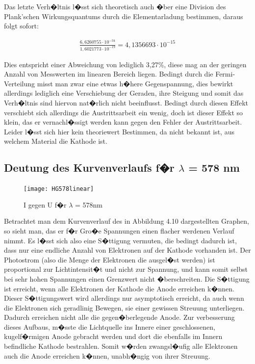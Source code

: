 \documentclass[a4paper, 10pt]{report}%
\begin{document}
Das letzte Verh�ltnis l�sst sich theoretisch auch �ber eine Division des Plank'schen Wirkungsquantums durch die Elementarladung bestimmen, daraus folgt sofort:

\begin{eqnarray}
\nonumber
\frac{6,6260755 \cdot 10^{-34}}{1,6021773 \cdot 10^{-19}} = 4,1356693 \cdot 10^{-15}
\end{eqnarray}

Dies entspricht einer Abweichung von lediglich 3,27\%, diese mag an der geringen Anzahl von Messwerten im linearen Bereich liegen. Bedingt durch die Fermi-Verteilung misst man zwar eine etwas h�here Gegenspannung, dies bewirkt allerdings lediglich eine Verschiebung der Geraden, ihre Steigung und somit das Verh�ltnis sind hiervon nat�rlich nicht beeinflusst. Bedingt durch diesen Effekt verschiebt sich allerdings die Austrittsarbeit ein wenig, doch ist dieser Effekt so klein, das er vernachl�ssigt werden kann gegen den Fehler der Austrittsarbeit. Leider l�sst sich hier kein theoriewert Bestimmen, da nicht bekannt ist, aus welchem Material die Kathode ist. 

\subsection{Deutung des Kurvenverlaufs f�r $\lambda$ = 578 nm}

\begin{figure}[!htbp]
	\begin{center}
		\texttt{[image: HG578linear]}
	\end{center}
	\caption{I gegen U f�r $\lambda$ = 578nm}
	\label{fig:abbildung1}
\end{figure}

Betrachtet man dem Kurvenverlauf des in Abbildung 4.10 dargestellten Graphen, so sieht man, das er f�r Gro�e Spannungen einen flacher werdenen Verlauf nimmt. Es l�sst sich also eine S�ttigung vermuten, die bedingt dadurch ist, dass nur eine endliche Anzahl von Elektronen auf der Kathode vorhanden ist. Der Photostrom (also die Menge der Elektronen die ausgel�st werden) ist proportional zur Lichtintensit�t und nicht zur Spannung, und kann somit selbst bei sehr hohen Spannungen einen Grenzwert nicht �berschreiten. Die S�ttigung ist erreicht, wenn alle Elektronen der Kathode die Anode erreichen k�nnen. Dieser S�ttigungswert wird allerdings nur asymptotisch erreicht, da auch wenn die Elektronen sich geradlinig Bewegen, sie einer gewissen Streuung unterliegen. Dadurch erreichen nicht alle die gegen�berlegende Anode. Zur verbesserung dieses Aufbaus, m�sste die Lichtquelle ins Innere einer geschlossenen, kugelf�rmigen Anode gebracht werden und dort die ebenfalls im Innern befindliche Kathode bestrahlen. Somit w�rden zwangsl�ufig alle Elektronen auch die Anode erreichen k�nnen, unabh�ngig von ihrer Streuung. 
\end{document}
